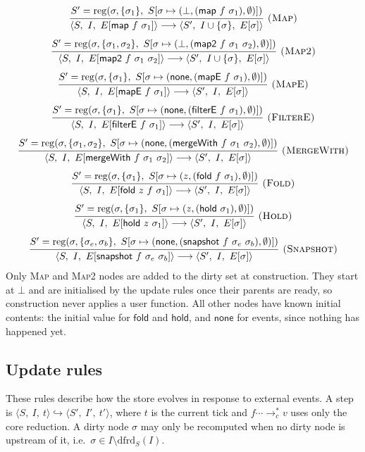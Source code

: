 \documentclass{article}
\makeatletter
\newcommand{\kw}[1]{\mathsf{#1}}
\newcommand{\none}{\kw{none}}
\newcommand{\cfg}[3]{\langle #1,\ #2,\ #3\rangle}
\newcommand{\step}{\longrightarrow}
\newcommand{\cstar}{\mathrel{\longrightarrow_{c}^{*}}}
\newcommand{\ustep}{\hookrightarrow}
\newcommand{\dfrd}{\mathrm{dfrd}}
\newcommand{\fire}{\sigma \in I \setminus \dfrd_S(I)}
\newcommand{\rul}[3]{\[\dfrac{\begin{array}{@{}c@{}}#2\end{array}}{\begin{array}{@{}c@{}}#3\end{array}}\ \textsc{#1}\]}
\makeatother
\begin{document}
\rul{(Map)}{S' = \mathrm{reg}(\sigma,\{\sigma_1\},\ S[\sigma \mapsto (\bot,(\kw{map}\ f\ \sigma_1),\emptyset)])}
{\cfg{S}{I}{E[\kw{map}\ f\ \sigma_1]} \step \cfg{S'}{I \cup \{\sigma\}}{E[\sigma]}}
\rul{(Map2)}{S' = \mathrm{reg}(\sigma,\{\sigma_1,\sigma_2\},\ S[\sigma \mapsto (\bot,(\kw{map2}\ f\ \sigma_1\ \sigma_2),\emptyset)])}
{\cfg{S}{I}{E[\kw{map2}\ f\ \sigma_1\ \sigma_2]} \step \cfg{S'}{I \cup \{\sigma\}}{E[\sigma]}}
\rul{(MapE)}{S' = \mathrm{reg}(\sigma,\{\sigma_1\},\ S[\sigma \mapsto (\none,(\kw{mapE}\ f\ \sigma_1),\emptyset)])}
{\cfg{S}{I}{E[\kw{mapE}\ f\ \sigma_1]} \step \cfg{S'}{I}{E[\sigma]}}
\rul{(FilterE)}{S' = \mathrm{reg}(\sigma,\{\sigma_1\},\ S[\sigma \mapsto (\none,(\kw{filterE}\ f\ \sigma_1),\emptyset)])}
{\cfg{S}{I}{E[\kw{filterE}\ f\ \sigma_1]} \step \cfg{S'}{I}{E[\sigma]}}
\rul{(MergeWith)}{S' = \mathrm{reg}(\sigma,\{\sigma_1,\sigma_2\},\ S[\sigma \mapsto (\none,(\kw{mergeWith}\ f\ \sigma_1\ \sigma_2),\emptyset)])}
{\cfg{S}{I}{E[\kw{mergeWith}\ f\ \sigma_1\ \sigma_2]} \step \cfg{S'}{I}{E[\sigma]}}
\rul{(Fold)}{S' = \mathrm{reg}(\sigma,\{\sigma_1\},\ S[\sigma \mapsto (z,(\kw{fold}\ f\ \sigma_1),\emptyset)])}
{\cfg{S}{I}{E[\kw{fold}\ z\ f\ \sigma_1]} \step \cfg{S'}{I}{E[\sigma]}}
\rul{(Hold)}{S' = \mathrm{reg}(\sigma,\{\sigma_1\},\ S[\sigma \mapsto (z,(\kw{hold}\ \sigma_1),\emptyset)])}
{\cfg{S}{I}{E[\kw{hold}\ z\ \sigma_1]} \step \cfg{S'}{I}{E[\sigma]}}
\rul{(Snapshot)}{S' = \mathrm{reg}(\sigma,\{\sigma_e,\sigma_b\},\ S[\sigma \mapsto (\none,(\kw{snapshot}\ f\ \sigma_e\ \sigma_b),\emptyset)])}
{\cfg{S}{I}{E[\kw{snapshot}\ f\ \sigma_e\ \sigma_b]} \step \cfg{S'}{I}{E[\sigma]}}
Only \textsc{Map} and \textsc{Map2} nodes are added to the dirty set at construction. They start at $\bot$ and are initialised by the update rules once their parents are ready, so construction never applies a user function. All other nodes have known initial contents: the initial value for $\kw{fold}$ and $\kw{hold}$, and $\none$ for events, since nothing has happened yet.

\subsection{Update rules}

These rules describe how the store evolves in response to external events. A step is $\cfg{S}{I}{t} \ustep \cfg{S'}{I'}{t'}$, where $t$ is the current tick and $f \cdots \cstar v$ uses only the core reduction. A dirty node $\sigma$ may only be recomputed when no dirty node is upstream of it, i.e.\ $\fire$.
\end{document}
